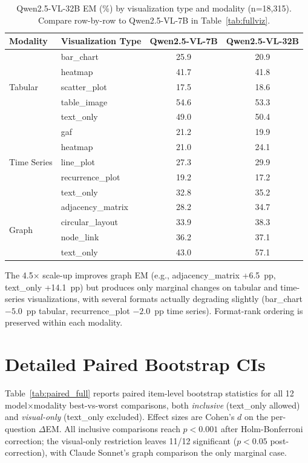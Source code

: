 \documentclass{article}
\begin{document}
\begin{table}[h]
\centering
\small
\caption{Qwen2.5-VL-32B EM (\%) by visualization type and modality (n=18{,}315). Compare row-by-row to Qwen2.5-VL-7B in Table~\ref{tab:fullviz}.}
\label{tab:qwen32b_viz}
\begin{tabular}{llcc}
\toprule
Modality & Visualization Type & Qwen2.5-VL-7B & Qwen2.5-VL-32B \\
\midrule
\multirow{5}{*}{Tabular} & bar\_chart      & 25.9 & 20.9 \\
                         & heatmap         & 41.7 & 41.8 \\
                         & scatter\_plot   & 17.5 & 18.6 \\
                         & table\_image    & 54.6 & 53.3 \\
                         & text\_only      & 49.0 & 50.4 \\
\midrule
\multirow{5}{*}{Time Series} & gaf             & 21.2 & 19.9 \\
                             & heatmap         & 21.0 & 24.1 \\
                             & line\_plot      & 27.3 & 29.9 \\
                             & recurrence\_plot & 19.2 & 17.2 \\
                             & text\_only      & 32.8 & 35.2 \\
\midrule
\multirow{4}{*}{Graph} & adjacency\_matrix & 28.2 & 34.7 \\
                       & circular\_layout  & 33.9 & 38.3 \\
                       & node\_link        & 36.2 & 37.1 \\
                       & text\_only        & 43.0 & 57.1 \\
\bottomrule
\end{tabular}
\end{table}

The 4.5$\times$ scale-up improves graph EM (e.g., adjacency\_matrix +6.5~pp, text\_only +14.1~pp) but produces only marginal changes on tabular and time-series visualizations, with several formats actually degrading slightly (bar\_chart $-5.0$~pp tabular, recurrence\_plot $-2.0$~pp time series). Format-rank ordering is preserved within each modality.

\section{Detailed Paired Bootstrap CIs}
\label{sec:paired_full}
Table~\ref{tab:paired_full} reports paired item-level bootstrap statistics for all 12 model$\times$modality best-vs-worst comparisons, both \emph{inclusive} (text\_only allowed) and \emph{visual-only} (text\_only excluded). Effect sizes are Cohen's $d$ on the per-question $\Delta$EM. All inclusive comparisons reach $p<0.001$ after Holm-Bonferroni correction; the visual-only restriction leaves 11/12 significant ($p<0.05$ post-correction), with Claude Sonnet's graph comparison the only marginal case.
\end{document}
